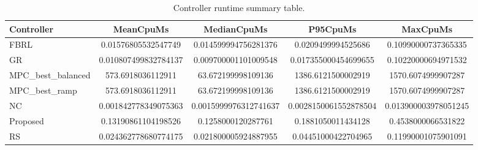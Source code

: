 \begin{table}[t]
\centering
\caption{Controller runtime summary table.}
\label{tab:runtime_auto}
\begin{tabular}{lcccc}
\toprule
Controller & MeanCpuMs & MedianCpuMs & P95CpuMs & MaxCpuMs \\
\midrule
FBRL & 0.01576805532547749 & 0.014599994756281376 & 0.0209499994525686 & 0.10990000737365335 \\
GR & 0.010807499832784137 & 0.009700001101009548 & 0.017355000454699655 & 0.10220000694971532 \\
MPC\_best\_balanced & 573.6918036112911 & 63.672199998109136 & 1386.6121500002919 & 1570.6074999907287 \\
MPC\_best\_ramp & 573.6918036112911 & 63.672199998109136 & 1386.6121500002919 & 1570.6074999907287 \\
NC & 0.001842778349075363 & 0.0015999976312741637 & 0.0028150061552878504 & 0.013900003978051245 \\
Proposed & 0.13190861104198526 & 0.1258000120287761 & 0.1881050011434128 & 0.4538000066531822 \\
RS & 0.024362778680774175 & 0.021800005924887955 & 0.04451000422704965 & 0.11990001075901091 \\
\bottomrule
\end{tabular}
\end{table}
